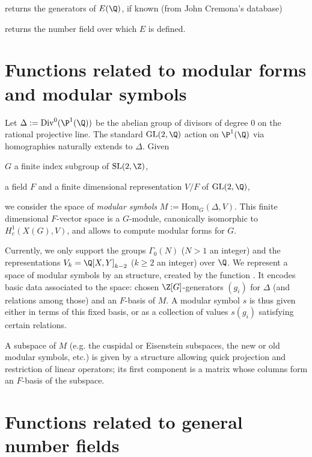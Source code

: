 \item {} returns the generators of $E(\Q)$, if known (from John
  Cremona's database)


\item {} returns the number field over which $E$ is defined.



\section{Functions related to modular forms and modular symbols}

Let $\Delta := \text{Div}^0(\P^1(\Q))$ be the abelian group of divisors of
degree $0$ on the rational projective line. The standard $\text{GL}(2,\Q)$
action on $\P^1(\Q)$ via homographies naturally extends to $\Delta$. Given

\item $G$ a finite index subgroup of $\text{SL}(2,\Z)$,

\item a field $F$ and a finite dimensional representation $V/F$ of
  $\text{GL}(2,\Q)$,

\noindent we consider the space of \emph{modular symbols} $M :=
\text{Hom}_G(\Delta, V)$. This finite dimensional $F$-vector
space is a $G$-module, canonically isomorphic to $H^1_c(X(G), V)$,
and allows to compute modular forms for $G$.

Currently, we only support the groups $\Gamma_0(N)$ ($N > 1$ an integer)
and the representations $V_k = \Q[X,Y]_{k-2}$ ($k \geq 2$ an integer) over
$\Q$. We represent a space of modular symbols by an  structure,
created by the function . It encodes basic data associated to the
space: chosen $\Z[G]$-generators $(g_i)$ for $\Delta$ (and relations among
those) and an $F$-basis of $M$. A modular symbol $s$ is thus given either in
terms of this fixed basis, or as a collection of values $s(g_i)$
satisfying certain relations.

A subspace of $M$ (e.g. the cuspidal or Eisenstein subspaces, the new or
old modular symbols, etc.) is given by a structure allowing quick projection
and restriction of linear operators; its first component is a matrix whose
columns  form  an $F$-basis  of the subspace.


\section{Functions related to general number fields}

